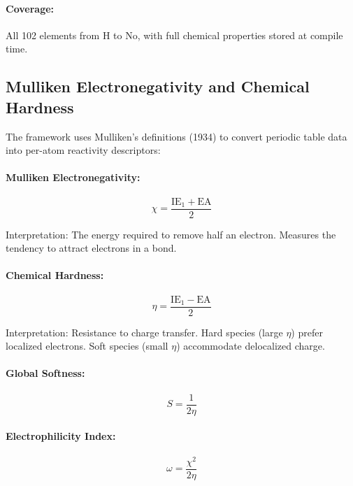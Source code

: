 \documentclass[11pt]{article}
\begin{document}
\paragraph{Coverage:} All 102 elements from H to No, with full chemical properties stored at compile time.

\subsection{Mulliken Electronegativity and Chemical Hardness}

The framework uses Mulliken's definitions (1934) to convert periodic table data into per-atom reactivity descriptors:

\paragraph{Mulliken Electronegativity:}
\begin{equation}
\chi = \frac{\text{IE}_1 + \text{EA}}{2}
\end{equation}

Interpretation: The energy required to remove half an electron. Measures the tendency to attract electrons in a bond.

\paragraph{Chemical Hardness:}
\begin{equation}
\eta = \frac{\text{IE}_1 - \text{EA}}{2}
\end{equation}

Interpretation: Resistance to charge transfer. Hard species (large $\eta$) prefer localized electrons. Soft species (small $\eta$) accommodate delocalized charge.

\paragraph{Global Softness:}
\begin{equation}
S = \frac{1}{2\eta}
\end{equation}

\paragraph{Electrophilicity Index:}
\begin{equation}
\omega = \frac{\chi^2}{2\eta}
\end{equation}
\end{document}
